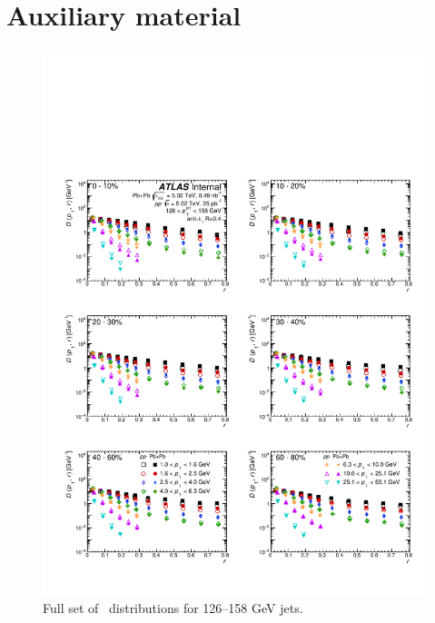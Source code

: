 
\part*{Auxiliary material}



\begin{figure}[h]
\includegraphics[width=1.0\textwidth]{figures/results/DpT_dR_jet7.pdf}
\caption{Full set of \Dptr\ distributions for 126--158 GeV jets.}
\label{fig:fullset_dptr_j7}
\end{figure}

